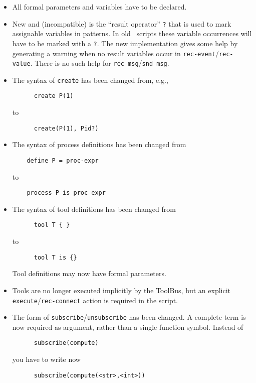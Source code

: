\begin{itemize}

\item All formal parameters and variables have to be declared.

\item New and (incompatible) is the ``result operator'' {\tt ?} that is used
  to mark assignable variables in patterns. In old \T\ scripts these
  variable occurrences will have to be marked with a {\tt ?}.
  The new implementation gives some help by generating
  a warning when no result variables occur in {\tt rec-event}/{\tt rec-value}.
  There is no such help for {\tt rec-msg}/{\tt snd-msg}.

\item The syntax of {\tt create} has been changed from, e.g.,
\begin{verbatim}
      create P(1)
\end{verbatim}
to
\begin{verbatim}
      create(P(1), Pid?)
\end{verbatim}

\item The syntax of process definitions has been changed from
\begin{verbatim}
	define P = proc-expr
\end{verbatim}
  to
\begin{verbatim}
	process P is proc-expr
\end{verbatim}

\item  The syntax of tool definitions has been changed from
\begin{verbatim}
      tool T { }
\end{verbatim}
  to
\begin{verbatim}
      tool T is {}
\end{verbatim}
Tool definitions may now have formal parameters.

\item Tools are no longer executed implicitly by the ToolBus, but an
  explicit {\tt execute}/{\tt rec-connect} action is required in the script.

\item The form of {\tt subscribe}/{\tt unsubscribe} has been changed. A complete
  term is now required as argument, rather than a single function
  symbol. Instead of
\begin{verbatim}
      subscribe(compute)
\end{verbatim}
  you have to write now
\begin{verbatim}
      subscribe(compute(<str>,<int>))
\end{verbatim}

\end{itemize}

